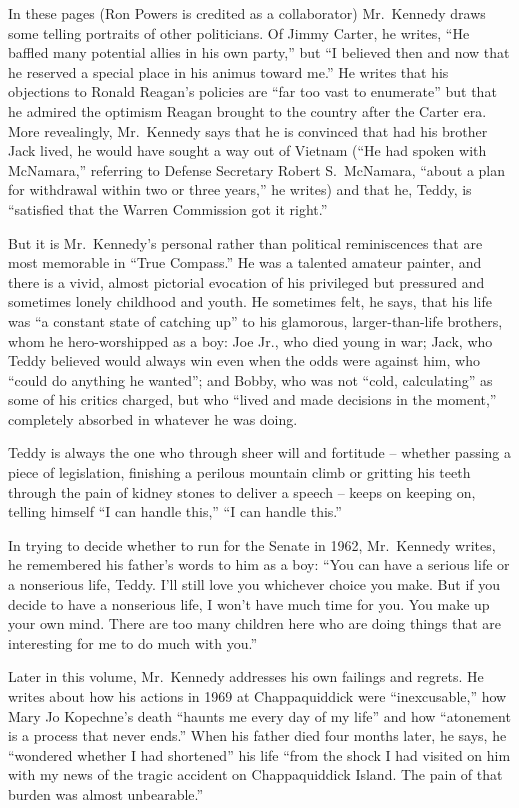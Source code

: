﻿\documentclass[12pt]{article}
\begin{document}
In these pages (Ron Powers is credited as a collaborator) Mr.~Kennedy draws some telling portraits
of other politicians. Of Jimmy Carter, he writes, ``He baffled\cite{baffle} many potential allies in
his own party,'' but ``I believed then and now that he reserved a special place in his
animus\cite{animus} toward me.'' He writes that his objections to Ronald Reagan's policies are ``far
too vast to enumerate'' but that he admired the optimism Reagan brought to the country after the
Carter era. More revealingly, Mr.~Kennedy says that he is convinced that had his brother Jack lived,
he would have sought a way out of Vietnam (``He had spoken with McNamara,'' referring to Defense
Secretary Robert S.~McNamara, ``about a plan for withdrawal within two or three years,'' he writes)
and that he, Teddy, is ``satisfied that the Warren Commission got it right.''

But it is Mr.~Kennedy's personal rather than political reminiscences that are most memorable in
``True Compass.'' He was a talented amateur painter, and there is a vivid, almost pictorial
evocation of his privileged but pressured and sometimes lonely childhood and youth. He sometimes
felt, he says, that his life was ``a constant state of catching up'' to his glamorous,
larger-than-life brothers, whom he hero-worshipped as a boy: Joe Jr., who died young in war; Jack,
who Teddy believed would always win even when the odds were against him, who ``could do anything he
wanted''; and Bobby, who was not ``cold, calculating'' as some of his critics charged, but who
``lived and made decisions in the moment,'' completely absorbed in whatever he was doing.

Teddy is always the one who through sheer\cite{sheer} will and fortitude -- whether passing a piece
of legislation, finishing a perilous mountain climb or gritting his teeth through the pain of kidney
stones to deliver a speech -- keeps on keeping on, telling himself ``I can handle this,'' ``I can
handle this.''

In trying to decide whether to run for the Senate in 1962, Mr.~Kennedy writes, he remembered his
father's words to him as a boy: ``You can have a serious life or a nonserious life, Teddy. I'll
still love you whichever choice you make. But if you decide to have a nonserious life, I won't have
much time for you. You make up your own mind. There are too many children here who are doing things
that are interesting for me to do much with you.''

Later in this volume, Mr.~Kennedy addresses his own failings and regrets. He writes about how his
actions in 1969 at Chappaquiddick were ``inexcusable,'' how Mary Jo Kopechne's death ``haunts me
every day of my life'' and how ``atonement is a process that never ends.'' When his father died four
months later, he says, he ``wondered whether I had shortened'' his life ``from the shock I had
visited on him with my news of the tragic accident on Chappaquiddick Island. The pain of that burden
was almost unbearable.''
\end{document}
